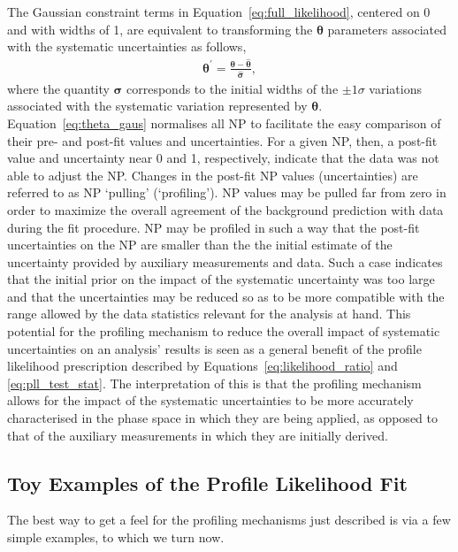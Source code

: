 The Gaussian constraint terms in Equation~\ref{eq:full_likelihood}, centered on 0 and with widths of 1,
are equivalent to transforming the $\bm{\theta}$ parameters associated with the systematic uncertainties as follows,
\begin{align}
    \bm{\theta}^{\prime} = \frac{\bm{\theta} - \bm{\hat{\theta}}}{\bm{\hat{\sigma}}},
    \label{eq:theta_gaus}
\end{align}
where the quantity $\bm{\sigma}$ corresponds to the initial widths of the $\pm 1 \sigma$ variations
associated with the systematic variation represented by $\bm{\theta}$.
Equation~\ref{eq:theta_gaus} normalises all NP to facilitate the easy comparison of their pre- and post-fit values and uncertainties.
For a given NP, then, a post-fit value and uncertainty near 0 and 1, respectively, indicate
that the data was not able to adjust the NP.
Changes in the post-fit NP values (uncertainties) are referred to as NP `pulling' (`profiling').
NP values may be pulled far from zero in order to maximize the overall agreement of the background prediction
with data during the fit procedure.
NP may be profiled in such a way that the post-fit uncertainties on the NP are smaller than the
the initial estimate of the uncertainty provided by auxiliary measurements and data.
Such a case indicates that the initial prior on the impact of the systematic uncertainty was too
large and that the uncertainties may be reduced so as to be more compatible  with the range allowed by
the data statistics relevant for the analysis at hand.
This potential for the profiling mechanism to reduce the overall impact of systematic uncertainties
on an analysis' results is seen as a general benefit of the profile likelihood prescription described
by Equations~\ref{eq:likelihood_ratio} and \ref{eq:pll_test_stat}.
The interpretation of this is that the profiling mechanism allows for the impact of the systematic uncertainties
to be more accurately characterised in the phase space in which they are being applied, as opposed
to that of the auxiliary measurements in which they are initially derived.


\subsection{Toy Examples of the Profile Likelihood Fit}
\label{sec:profile_examples}

The best way to get a feel for the profiling mechanisms just described is via a few simple
examples, to which we turn now.

